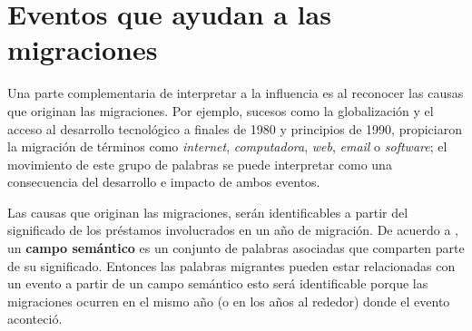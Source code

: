 \section{Eventos que ayudan a las migraciones} %

Una parte complementaria de interpretar a la influencia es al reconocer las causas que originan las migraciones. Por ejemplo, sucesos como la globalización y el acceso al desarrollo tecnológico a finales de 1980 y principios de 1990, propiciaron la migración  de términos como \textit{internet}, \textit{computadora}, \textit{web}, \textit{email} o \textit{software}; el movimiento de este grupo de palabras se puede interpretar como una consecuencia del desarrollo e impacto de ambos eventos. 

Las causas que originan las migraciones, serán identificables a partir del significado de los préstamos involucrados en un año de migración. De acuerdo a \cite{mcgraw}, un  \textbf{campo semántico} es un conjunto de palabras asociadas que comparten parte de su significado. Entonces las palabras migrantes pueden estar relacionadas con un evento a partir de un campo semántico esto será identificable porque las migraciones ocurren en el mismo año (o en los años al rededor) donde el evento aconteció. 


















